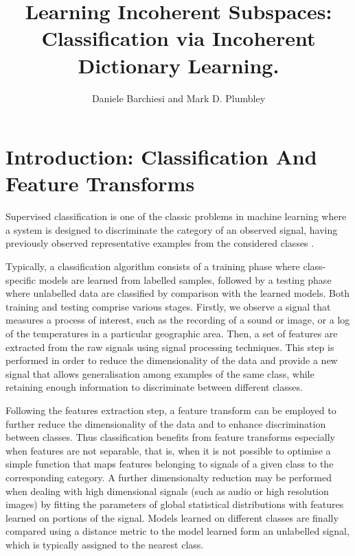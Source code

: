 \documentclass{article}
\title{Learning Incoherent Subspaces: Classification via Incoherent Dictionary Learning.}
\author{Daniele Barchiesi and Mark D. Plumbley}
\begin{document}
%

\maketitle
%
\begin{abstract}

\end{abstract}
%
%
\section{Introduction: Classification And Feature Transforms}\label{sec:intro}
Supervised classification is one of the classic problems in machine learning where a system is designed to discriminate the category of an observed signal, having previously observed representative examples from the considered classes \cite{Duda1973Pa}.

Typically, a classification algorithm consists of a training phase where  class-specific models are learned from labelled samples, followed by a testing phase where unlabelled data are classified by comparison with the learned models. Both training and testing comprise various stages. Firstly, we observe a signal that measures a process of interest, such as the recording of a sound or image, or a log of the temperatures in a particular geographic area. Then, a set of features are extracted from the raw signals using signal processing techniques. This step is performed in order to reduce the dimensionality of the data and provide a new signal that allows generalisation among examples of the same class, while retaining enough information to discriminate between different classes. 

Following the features extraction step, a feature transform can be employed to further reduce the dimensionality of the data and to enhance discrimination between classes. Thus classification benefits from feature transforms especially when features are not separable, that is, when it is not possible to optimise a simple function that maps features belonging to signals of a given class to the corresponding category. 
A further dimensionalty reduction may be performed when dealing with high dimensional signals (such as audio or high resolution images) by fitting the parameters of global statistical distributions with features learned on portions of the signal. Models learned on different classes are finally compared using a distance metric to the model learned form an unlabelled signal, which is typically assigned to the nearest class.
\end{document}
